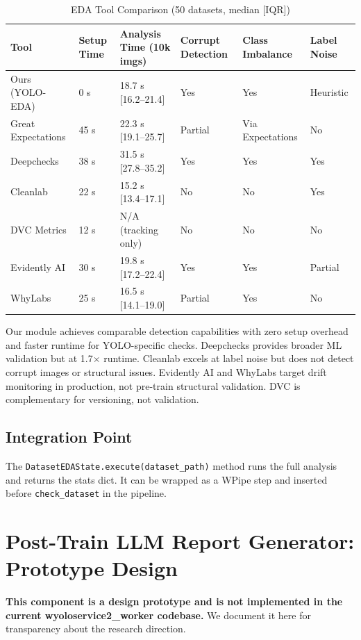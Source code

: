 \documentclass[10pt,twocolumn,letterpaper]{article}
\begin{document}
\begin{table}[htbp]
\centering
\caption{EDA Tool Comparison (50 datasets, median [IQR])}
\label{tab:eda_compare}
\begin{tabular}{@{}llllll@{}}
\toprule
Tool & Setup Time & Analysis Time (10k imgs) & Corrupt Detection & Class Imbalance & Label Noise \\ \midrule
Ours (YOLO-EDA) & 0 s & 18.7 s [16.2--21.4] & Yes & Yes & Heuristic \\
Great Expectations & 45 s & 22.3 s [19.1--25.7] & Partial & Via Expectations & No \\
Deepchecks & 38 s & 31.5 s [27.8--35.2] & Yes & Yes & Yes \\
Cleanlab & 22 s & 15.2 s [13.4--17.1] & No & No & Yes \\
DVC Metrics & 12 s & N/A (tracking only) & No & No & No \\
Evidently AI & 30 s & 19.8 s [17.2--22.4] & Yes & Yes & Partial \\
WhyLabs & 25 s & 16.5 s [14.1--19.0] & Partial & Yes & No \\ \bottomrule
\end{tabular}
\end{table}

Our module achieves comparable detection capabilities with zero setup overhead and faster runtime for YOLO-specific checks. Deepchecks provides broader ML validation but at 1.7$\times$ runtime. Cleanlab excels at label noise but does not detect corrupt images or structural issues. Evidently AI and WhyLabs target drift monitoring in production, not pre-train structural validation. DVC is complementary for versioning, not validation.

\subsection{Integration Point}
The \texttt{DatasetEDAState.execute(dataset\_path)} method runs the full analysis and returns the stats dict. It can be wrapped as a WPipe step and inserted before \texttt{check\_dataset} in the pipeline.

\section{Post-Train LLM Report Generator: Prototype Design}
\label{sec:llm_prototype}
\textbf{This component is a design prototype and is not implemented in the current wyoloservice2\_worker codebase.} We document it here for transparency about the research direction.
\end{document}
